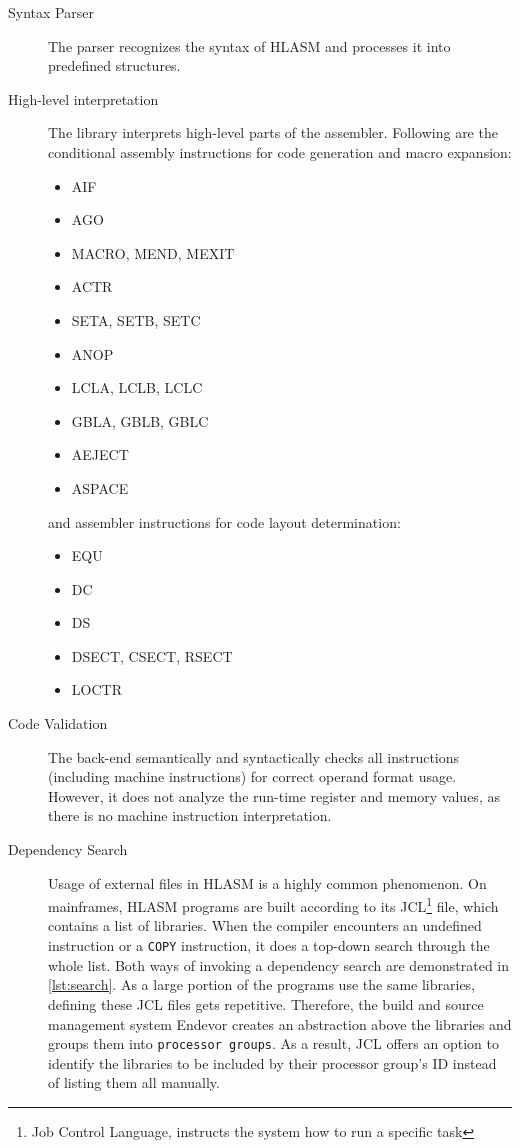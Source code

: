 \begin{description}
\item [Syntax Parser] The parser recognizes the syntax of HLASM and processes it into predefined structures. 

\item [High-level interpretation] The library interprets high-level parts of the assembler. Following are the conditional assembly instructions for code generation and macro expansion:
\begin{itemize}
    \item AIF
    \item AGO
    \item MACRO, MEND, MEXIT
    \item ACTR
    \item SETA, SETB, SETC
    \item ANOP
    \item LCLA, LCLB, LCLC
    \item GBLA, GBLB, GBLC
    \item AEJECT
    \item ASPACE
\end{itemize}
and assembler instructions for code layout determination:
\begin{itemize}
    \item EQU 
    \item DC 
    \item DS 
    \item DSECT, CSECT, RSECT 
    \item LOCTR
\end{itemize}

\item [Code Validation] The back-end semantically and syntactically checks all instructions (including machine instructions) for correct operand format usage. However, it does not analyze the run-time register and memory values, as there is no machine instruction interpretation.

\item [Dependency Search] Usage of external files in HLASM is a highly common phenomenon. On mainframes, HLASM programs are built according to its JCL\footnote{Job Control Language, instructs the system how to run a specific task} file, which contains a list of libraries. When the compiler encounters an undefined instruction or a \texttt{COPY} instruction, it does a top-down search through the whole list. Both ways of invoking a dependency search are demonstrated in \cref{lst:search}. As a large portion of the programs use the same libraries, defining these JCL files gets repetitive. Therefore, the build and source management system Endevor creates an abstraction above the libraries and groups them into \texttt{processor groups}. As a result, JCL offers an option to identify the libraries to be included by their processor group's ID instead of listing them all manually.


\end{description}
